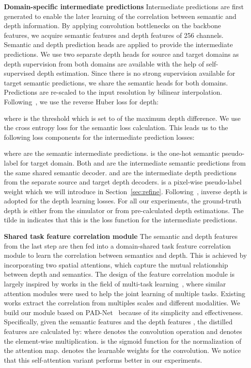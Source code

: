 \documentclass[10pt,twocolumn,letterpaper]{article}
\begin{document}
\textbf{Domain-specific intermediate predictions}
Intermediate predictions are first generated to enable the later learning of the correlation between semantic and depth information. By applying convolution bottlenecks on the backbone features, we acquire semantic features and depth features of 256 channels. Semantic and depth prediction heads are applied to provide the intermediate predictions. We use two separate depth heads for source and target domains as depth supervision from both domains are available with the help of self-supervised depth estimation. Since there is no strong supervision available for target semantic predictions, we share the semantic heads for both domains. Predictions are re-scaled to the input resolution by bilinear interpolation. Following~\cite{vu2019dada}, we use the reverse Huber loss for depth:

where  is the threshold which is set to  of the maximum depth difference. We use the cross entropy loss for the semantic loss calculation. This leads us to the following loss components for the intermediate prediction losses:


where  are the semantic intermediate predictions.  is the one-hot semantic pseudo-label for target domain. Both  and  are the intermediate semantic predictions from the same shared semantic decoder.   and  are the  intermediate depth predictions from the separate source and target depth decoders.  is a pixel-wise pseudo-label weight which we will introduce in Section~\ref{sec:refine}. Following~\cite{chen2019learning,vu2019dada}, inverse depth is adopted for the depth learning losses. For all our experiments, the ground-truth depth is either from the simulator or from pre-calculated depth estimations. The tilde in  indicates that this is the loss function for the intermediate predictions.

\textbf{Shared task feature correlation module}
The semantic and depth features from the last step are then fed into a domain-shared task feature correlation module to learn the correlation between semantics and depth. This is achieved by incorporating two spatial attentions, which capture the mutual relationship between depth and semantics. The design of the feature correlation module is largely inspired by works in the field of multi-task learning~\cite{vandenhende2020mti, xu2018pad}, where similar attention modules were used to help the joint learning of multiple tasks. Existing works extract the correlation from multiples scales and different modalities.  We build our module based on PAD-Net~\cite{xu2018pad} because of its simplicity and effectiveness. Specifically, given the semantic features  and the depth features , the distilled features  are calculated by:
where  denotes the convolution operation and  denotes the element-wise multiplication.  is the sigmoid function for the normalization of the attention map.  denotes the learnable  weights for the convolution. We notice that this self-attention variant performs better in our experiments. 
\end{document}
